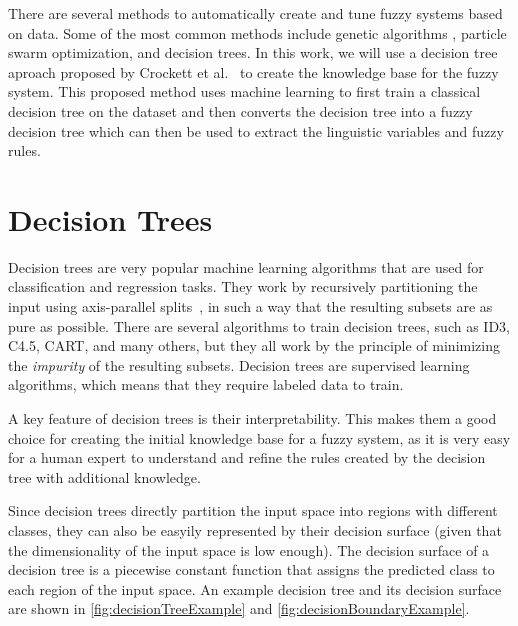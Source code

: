 There are several methods to automatically create and tune fuzzy systems based on data. Some of the most common methods include genetic algorithms , particle swarm optimization, and decision trees.
In this work, we will use a decision tree aproach proposed by Crockett et al.~\cite{CROCKETT20062809} to create the knowledge base for the fuzzy system. This proposed method uses machine learning to first train a classical decision tree on the dataset and then converts the decision tree into a fuzzy decision tree which can then be used to extract the linguistic variables and fuzzy rules.


\section{Decision Trees}

Decision trees are very popular machine learning algorithms that are used for classification and regression tasks. They work by recursively partitioning the input using axis-parallel splits~\cite{10.5555/2380985}, in such a way that the resulting subsets are as pure as possible. There are several algorithms to train decision trees, such as ID3, C4.5, CART, and many others, but they all work by the principle of minimizing the \textit{impurity} of the resulting subsets. Decision trees are supervised learning algorithms, which means that they require labeled data to train.

A key feature of decision trees is their interpretability. This makes them a good choice for creating the initial knowledge base for a fuzzy system, as it is very easy for a human expert to understand and refine the rules created by the decision tree with additional knowledge.

Since decision trees directly partition the input space into regions with different classes, they can also be easyily represented by their decision surface (given that the dimensionality of the input space is low enough). The decision surface of a decision tree is a piecewise constant function that assigns the predicted class to each region of the input space. An example decision tree and its decision surface are shown in \autoref{fig:decisionTreeExample} and \autoref{fig:decisionBoundaryExample}.

